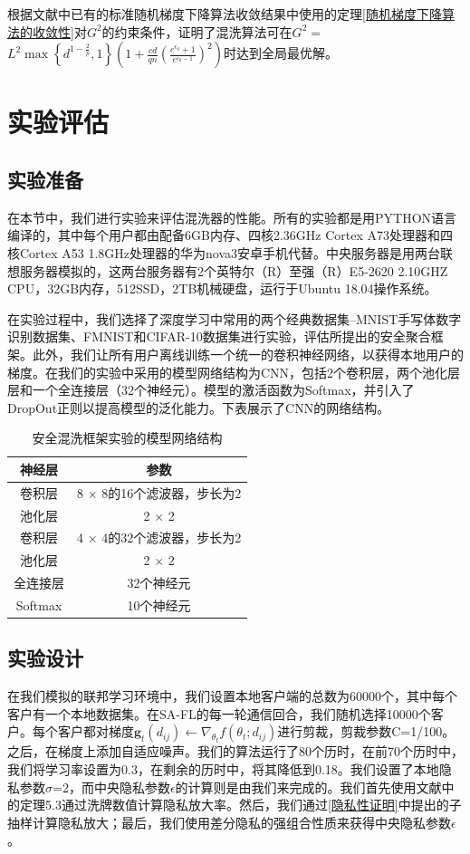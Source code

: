 根据文献中已有的标准随机梯度下降算法收敛结果中使用的定理\ref{随机梯度下降算法的收敛性}对$G^{2}$的约束条件，证明了混洗算法可在$G^{2}=$ $L^{2} \max \left\{d^{1-\frac{2}{p}}, 1\right\}\left(1+\frac{c d}{q n}\left(\frac{e^{\epsilon_{0}}+1}{e^{\epsilon_{0}-1}}\right)^{2}\right)$时达到全局最优解。

\section{实验评估}
\subsection{实验准备}
在本节中，我们进行实验来评估混洗器的性能。所有的实验都是用PYTHON语言编译的，其中每个用户都由配备6GB内存、四核2.36GHz Cortex A73处理器和四核Cortex A53 1.8GHz处理器的华为nova3安卓手机代替。中央服务器是用两台联想服务器模拟的，这两台服务器有2个英特尔（R）至强（R）E5-2620 2.10GHZ CPU，32GB内存，512SSD，2TB机械硬盘，运行于Ubuntu 18.04操作系统。

在实验过程中，我们选择了深度学习中常用的两个经典数据集--MNIST手写体数字识别数据集、FMNIST和CIFAR-10数据集进行实验，评估所提出的安全聚合框架。此外，我们让所有用户离线训练一个统一的卷积神经网络，以获得本地用户的梯度。在我们的实验中采用的模型网络结构为CNN，包括2个卷积层，两个池化层层和一个全连接层（32个神经元）。模型的激活函数为Softmax，并引入了DropOut正则以提高模型的泛化能力。下表展示了CNN的网络结构。

\begin{table}[H]
	\centering
	\begin{tabular}{cc}
		\hline
		神经层& 参数\\
		\hline
		卷积层& 8 × 8的16个滤波器，步长为2\\
		池化层& 2 × 2\\
		卷积层& 4 × 4的32个滤波器，步长为2\\
		池化层& 2 × 2\\
		全连接层& 32个神经元\\
		Softmax& 10个神经元\\
		\hline
	\end{tabular}
	\caption{安全混洗框架实验的模型网络结构}
	\label{tab1}
\end{table}

\subsection{实验设计}
在我们模拟的联邦学习环境中，我们设置本地客户端的总数为60000个，其中每个客户有一个本地数据集。在SA-FL的每一轮通信回合，我们随机选择10000个客户。每个客户都对梯度$\mathbf{g}_{t}\left(d_{i j}\right) \leftarrow \nabla_{\theta_{t}} f\left(\theta_{t} ; d_{i j}\right)$进行剪裁，剪裁参数C=1/100。之后，在梯度上添加自适应噪声。我们的算法运行了80个历时，在前70个历时中，我们将学习率设置为0.3，在剩余的历时中，将其降低到0.18。我们设置了本地隐私参数$\sigma$=2，而中央隐私参数$\epsilon$的计算则是由我们来完成的。我们首先使用文献中的定理5.3通过洗牌数值计算隐私放大率。然后，我们通过\ref{隐私性证明}中提出的子抽样计算隐私放大；最后，我们使用差分隐私的强组合性质来获得中央隐私参数$\epsilon$。

